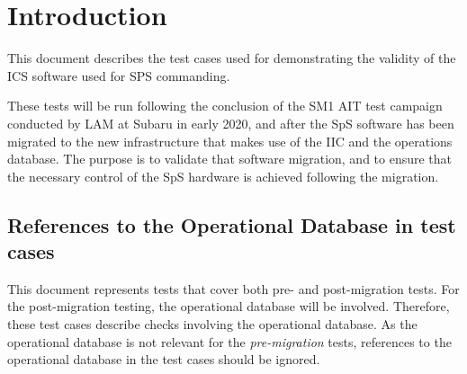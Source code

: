\section{Introduction}

This document describes the test cases used for demonstrating the
validity of the \acrshort{ICS} software used for SPS commanding.

These tests will be run following the conclusion of the SM1 AIT test campaign
conducted by LAM at Subaru in early 2020, and after the SpS software
has been migrated to the new infrastructure that makes use of the IIC and the
operations database. The purpose is to validate that software migration, and
to ensure that the necessary control of the SpS hardware is achieved following
the migration.

\subsection{References to the Operational Database in test cases}

This document represents tests that cover both pre- and post-migration tests. 
For the post-migration testing, the operational database will be involved.
Therefore, these test cases describe checks involving the operational database. 
As the operational database is not relevant for the {\it pre-migration} tests,
references to the operational database in the test cases should be ignored.
 
